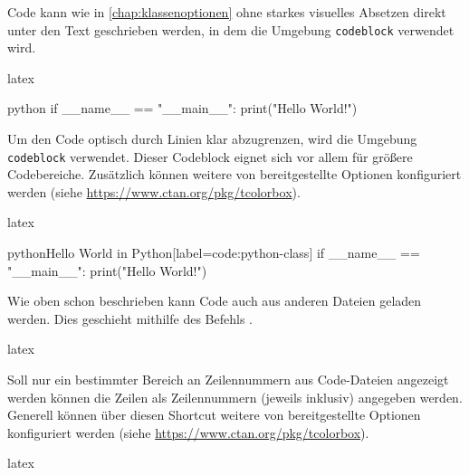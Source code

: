 Code kann wie in \autoref{chap:klassenoptionen} ohne starkes visuelles Absetzen direkt unter den Text geschrieben werden, in dem die Umgebung \texttt{codeblock} verwendet wird.

\begin{showcode}{latex}
    \begin{code}{python}
        if __name__ == "__main__":
            print("Hello World!")
    \end{code}
\end{showcode}

Um den Code optisch durch Linien klar abzugrenzen, wird die Umgebung \texttt{codeblock} verwendet. Dieser Codeblock eignet sich vor allem für größere Codebereiche. Zusätzlich können weitere von \texttt{\NewTCBInputListing} bereitgestellte Optionen konfiguriert werden (siehe \url{https://www.ctan.org/pkg/tcolorbox}).

\begin{showcode}{latex}
    \begin{codeblock}{python}{Hello World in Python}[label={code:python-class}]
        if __name__ == "__main__":
            print("Hello World!")
    \end{codeblock}
\end{showcode}

Wie oben schon beschrieben kann Code auch aus anderen Dateien geladen werden. Dies geschieht mithilfe des Befehls \texttt{}.

\begin{showcode}{latex}
\end{showcode}

Soll nur ein bestimmter Bereich an Zeilennummern aus Code-Dateien angezeigt werden können die Zeilen als Zeilennummern (jeweils inklusiv) angegeben werden. Generell können über diesen Shortcut weitere von \texttt{\NewTCBInputListing} bereitgestellte Optionen konfiguriert werden (siehe \url{https://www.ctan.org/pkg/tcolorbox}).

\begin{showcode}{latex}
\end{showcode}